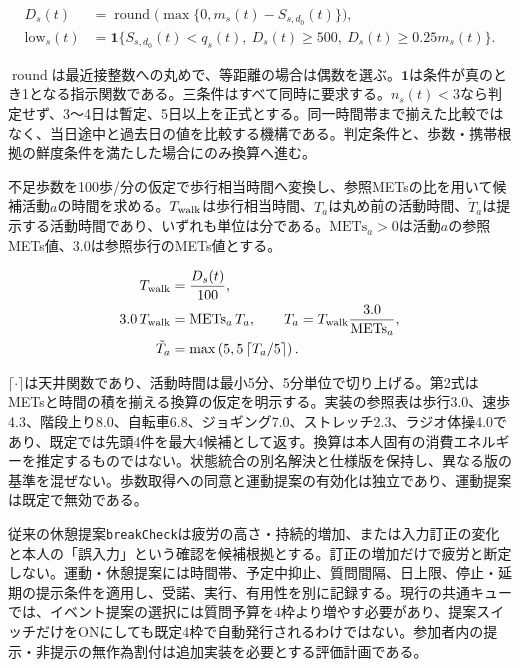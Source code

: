 \[
\begin{aligned}
D_s(t)&=\operatorname{round}
\bigl(\max\{0,m_s(t)-S_{s,d_0}(t)\}\bigr),\\
\mathrm{low}_s(t)&=
\mathbf1\{S_{s,d_0}(t)<q_s(t),\
D_s(t)\ge500,\ D_s(t)\ge0.25m_s(t)\}.
\end{aligned}
\]

\(\operatorname{round}\)は最近接整数への丸めで、等距離の場合は偶数を選ぶ。\(\mathbf1\)は条件が真のとき1となる指示関数である。三条件はすべて同時に要求する。\(n_s(t)<3\)なら判定せず、3〜4日は暫定、5日以上を正式とする。同一時間帯まで揃えた比較ではなく、当日途中と過去日の値を比較する機構である。判定条件と、歩数・携帯根拠の鮮度条件を満たした場合にのみ換算へ進む。

不足歩数を100歩/分の仮定で歩行相当時間へ変換し、参照METsの比を用いて候補活動\(a\)の時間を求める\autocite{ainsworth2011compendium,tudorlocke2019cadence}。\(T_{\rm walk}\)は歩行相当時間、\(T_a\)は丸め前の活動時間、\(\tilde T_a\)は提示する活動時間であり、いずれも単位は分である。\(\mathrm{METs}_a>0\)は活動\(a\)の参照METs値、3.0は参照歩行のMETs値とする。

\[
\begin{aligned}
T_{\rm walk}&=\frac{D_s(t)}{100},\\
3.0\,T_{\rm walk}&=\mathrm{METs}_a\,T_a,\qquad
T_a=T_{\rm walk}\frac{3.0}{\mathrm{METs}_a},\\
\tilde T_a&=\max\left(5,5\left\lceil T_a/5\right\rceil\right).
\end{aligned}
\]

\(\lceil\cdot\rceil\)は天井関数であり、活動時間は最小5分、5分単位で切り上げる。第2式はMETsと時間の積を揃える換算の仮定を明示する。実装の参照表は歩行3.0、速歩4.3、階段上り8.0、自転車6.8、ジョギング7.0、ストレッチ2.3、ラジオ体操4.0であり、既定では先頭4件を最大4候補として返す。換算は本人固有の消費エネルギーを推定するものではない。状態統合の別名解決と仕様版を保持し、異なる版の基準を混ぜない。歩数取得への同意と運動提案の有効化は独立であり、運動提案は既定で無効である。

従来の休憩提案\texttt{breakCheck}は疲労の高さ・持続的増加、または入力訂正の変化と本人の「誤入力」という確認を候補根拠とする。訂正の増加だけで疲労と断定しない。運動・休憩提案には時間帯、予定中抑止、質問間隔、日上限、停止・延期の提示条件を適用し、受諾、実行、有用性を別に記録する。現行の共通キューでは、イベント提案の選択には質問予算を4枠より増やす必要があり、提案スイッチだけをONにしても既定4枠で自動発行されるわけではない。参加者内の提示・非提示の無作為割付は追加実装を必要とする評価計画である。

